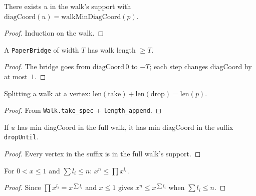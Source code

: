 \begin{lemma}
\begin{lemma}\label{lem:min_diag_achieved}
\leanok
{}
  There exists $u$ in the walk's support with
  $\mathrm{diagCoord}(u) = \mathrm{walkMinDiagCoord}(p)$.
\end{lemma}
\begin{proof}\leanok Induction on the walk.\end{proof}

\begin{lemma}\label{lem:bridge_len_ge}
\leanok
{}
  A \texttt{PaperBridge} of width $T$ has walk length $\geq T$.
\end{lemma}
\begin{proof}\leanok
  The bridge goes from $\mathrm{diagCoord}\,0$ to $-T$; each step
  changes diagCoord by at most~$1$.
\end{proof}

\begin{lemma}\label{lem:walk_split}
\leanok
  Splitting a walk at a vertex: $\mathrm{len}(\mathrm{take}) +
  \mathrm{len}(\mathrm{drop}) = \mathrm{len}(p)$.
\end{lemma}
\begin{proof}\leanok From \texttt{Walk.take\_spec} + \texttt{length\_append}.\end{proof}

\begin{lemma}\label{lem:drop_min}
\leanok
{}
  If $u$ has min diagCoord in the full walk, it has min diagCoord
  in the suffix \texttt{dropUntil}.
\end{lemma}
\begin{proof}\leanok
  Every vertex in the suffix is in the full walk's support.
\end{proof}

\begin{lemma}\label{lem:pow_prod}
\leanok
  For $0 < x \leq 1$ and $\sum l_i \leq n$:
  $x^n \leq \prod x^{l_i}$.
\end{lemma}
\begin{proof}\leanok
  Since $\prod x^{l_i} = x^{\sum l_i}$ and $x \leq 1$ gives
  $x^n \leq x^{\sum l_i}$ when $\sum l_i \leq n$.
\end{proof}


\end{lemma}
